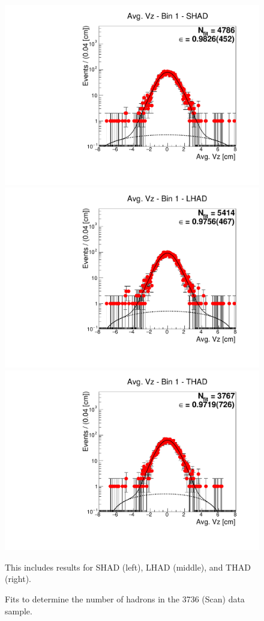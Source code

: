 \begin{figure}[H]
\centering
\includegraphics[scale=0.25]{figures/plots/nonDDbar_fit_results/scan/fit_scan_01_data_SHAD.pdf}
\hspace{-0.5cm}
\includegraphics[scale=0.25]{figures/plots/nonDDbar_fit_results/scan/fit_scan_01_data_LHAD.pdf}
\hspace{-0.5cm}
\includegraphics[scale=0.25]{figures/plots/nonDDbar_fit_results/scan/fit_scan_01_data_THAD.pdf}
\caption{Fits to determine the number of hadrons in the 3736 (Scan) data sample.}
{This includes results for SHAD (left), LHAD (middle), and THAD (right).}
\label{fig:hadron_fits_scan_01}
\end{figure}

